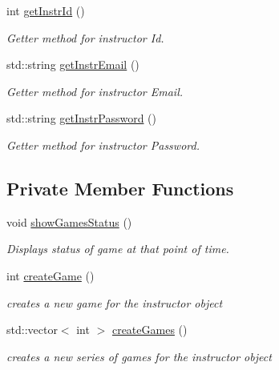 \begin{DoxyCompactItemize}
int \hyperlink{class_instructor_a7f9c4b2b1e3da3ca45d78a9f11a68fc0}{get\+Instr\+Id} ()
\begin{DoxyCompactList}\small\item\em Getter method for instructor Id. \end{DoxyCompactList}\item 
std\+::string \hyperlink{class_instructor_a91cb628e3c244a451f121236cbb3bc20}{get\+Instr\+Email} ()
\begin{DoxyCompactList}\small\item\em Getter method for instructor Email. \end{DoxyCompactList}\item 
std\+::string \hyperlink{class_instructor_a1e57077ab77d5ca2ea2d853f7a79b279}{get\+Instr\+Password} ()
\begin{DoxyCompactList}\small\item\em Getter method for instructor Password. \end{DoxyCompactList}\end{DoxyCompactItemize}
\subsection*{Private Member Functions}
\begin{DoxyCompactItemize}
\item 
void \hyperlink{class_instructor_a94f9564009326b43a3029fd3419e467b}{show\+Games\+Status} ()
\begin{DoxyCompactList}\small\item\em Displays status of game at that point of time. \end{DoxyCompactList}\item 
int \hyperlink{class_instructor_a9fca4b1272f062d14ffb5bb89b10b6f8}{create\+Game} ()
\begin{DoxyCompactList}\small\item\em creates a new game for the instructor object \end{DoxyCompactList}\item 
std\+::vector$<$ int $>$ \hyperlink{class_instructor_a8d3fa7d2c4cb8268d43db1bb8ecc56f9}{create\+Games} ()
\begin{DoxyCompactList}\small\item\em creates a new series of games for the instructor object \end{DoxyCompactList}\end{DoxyCompactItemize}
